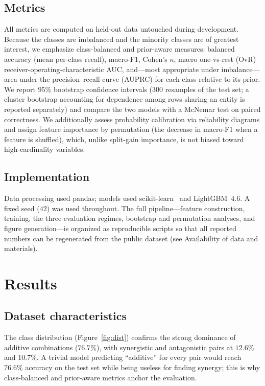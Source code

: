\documentclass{bmcart}
\begin{document}
\subsection*{Metrics}
All metrics are computed on held-out data untouched during development. Because the classes are
imbalanced and the minority classes are of greatest interest, we emphasize class-balanced and
prior-aware measures: balanced accuracy (mean per-class recall), macro-F1, Cohen's $\kappa$, macro
one-vs-rest (OvR) receiver-operating-characteristic AUC, and---most appropriate under imbalance---area
under the precision--recall curve (AUPRC) for each class relative to its prior. We report $95\%$
bootstrap confidence intervals ($300$ resamples of the test set; a cluster bootstrap accounting for
dependence among rows sharing an entity is reported separately) and compare the two models with a
McNemar test on paired correctness. We additionally assess probability calibration via reliability
diagrams and assign feature importance by permutation (the decrease in macro-F1 when a feature is
shuffled), which, unlike split-gain importance, is not biased toward high-cardinality variables.

\subsection*{Implementation}
Data processing used pandas; models used scikit-learn~\cite{pedregosa2011} and LightGBM~4.6. A fixed
seed ($42$) was used throughout. The full pipeline---feature construction, training, the three
evaluation regimes, bootstrap and permutation analyses, and figure generation---is organized as
reproducible scripts so that all reported numbers can be regenerated from the public dataset (see
Availability of data and materials).

\section*{Results}

\subsection*{Dataset characteristics}
The class distribution (Figure~\ref{fig:dist}) confirms the strong dominance of additive combinations
($76.7\%$), with synergistic and antagonistic pairs at $12.6\%$ and $10.7\%$. A trivial model
predicting ``additive'' for every pair would reach $76.6\%$ accuracy on the test set while being
useless for finding synergy; this is why class-balanced and prior-aware metrics anchor the evaluation.
\end{document}
